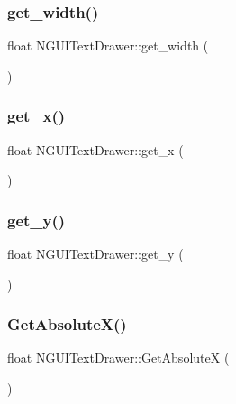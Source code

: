 \subsubsection{\texorpdfstring{get\+\_\+width()}{get\_width()}}
{\footnotesize\ttfamily float N\+G\+U\+I\+Text\+Drawer\+::get\+\_\+width (\begin{DoxyParamCaption}{ }\end{DoxyParamCaption})}

\hypertarget{class_n_g_u_i_text_drawer_a5fdc0563a9e1df38a2c0700b46951c89}{}\label{class_n_g_u_i_text_drawer_a5fdc0563a9e1df38a2c0700b46951c89} 
\subsubsection{\texorpdfstring{get\+\_\+x()}{get\_x()}}
{\footnotesize\ttfamily float N\+G\+U\+I\+Text\+Drawer\+::get\+\_\+x (\begin{DoxyParamCaption}{ }\end{DoxyParamCaption})}

\hypertarget{class_n_g_u_i_text_drawer_a51eca45a65294d0ee2db34906cc39d54}{}\label{class_n_g_u_i_text_drawer_a51eca45a65294d0ee2db34906cc39d54} 
\subsubsection{\texorpdfstring{get\+\_\+y()}{get\_y()}}
{\footnotesize\ttfamily float N\+G\+U\+I\+Text\+Drawer\+::get\+\_\+y (\begin{DoxyParamCaption}{ }\end{DoxyParamCaption})}

\hypertarget{class_n_g_u_i_text_drawer_a49901b5477d8ec4f63d1c913234e4e59}{}\label{class_n_g_u_i_text_drawer_a49901b5477d8ec4f63d1c913234e4e59} 
\subsubsection{\texorpdfstring{Get\+Absolute\+X()}{GetAbsoluteX()}}
{\footnotesize\ttfamily float N\+G\+U\+I\+Text\+Drawer\+::\+Get\+AbsoluteX (\begin{DoxyParamCaption}{ }\end{DoxyParamCaption})}

